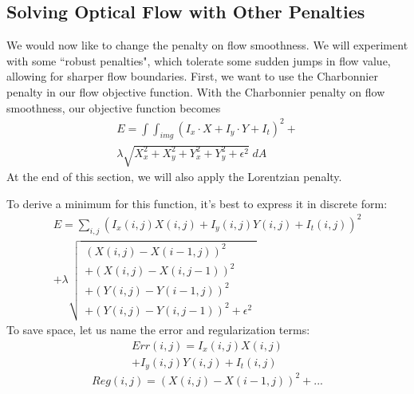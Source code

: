\documentclass[10pt,twocolumn,letterpaper]{article}
\begin{document}
\subsection{Solving Optical Flow with Other Penalties}
We would now like to change the penalty on flow smoothness.  We will experiment with some ``robust penalties", which tolerate some sudden jumps in flow value, allowing for sharper flow boundaries.  First, we want to use the Charbonnier penalty in our flow objective function.  With the Charbonnier penalty on flow smoothness, our objective function becomes
\begin{multline} \label{eq:objectivec}
E = \int \int_{img} (I_x \cdot X + I_y \cdot Y + I_t)^2 + \\
\lambda \sqrt{X_x^2 + X_y^2 + Y_x^2 + Y_y^2 + \epsilon^2} \; dA 
\end{multline}
At the end of this section, we will also apply the Lorentzian penalty.

To derive a minimum for this function, it's best to express it in discrete form:
\begin{multline} \label{eq:objectivecDiscrete}
E = \sum_{i,j} (I_x(i, j) X(i, j) + I_y(i, j) Y(i, j) + I_t(i, j))^2 \\
+ \lambda \sqrt{
\begin{array}{c}
(X(i, j) - X(i-1, j))^2 \\
+ (X(i,j) - X(i,j-1))^2 \\
+ (Y(i,j) - Y(i-1, j))^2 \\
+ (Y(i,j) - Y(i,j-1))^2 + \epsilon^2
\end{array}
}
\end{multline}
To save space, let us name the error and regularization terms:
\begin{multline} \label{eq:errorTerm}
Err(i, j) = I_x(i, j) X(i, j) \\
+ I_y(i, j) Y(i, j) + I_t(i, j)
\end{multline}
\begin{equation} \label{eq:regTerm}
Reg(i,j) = (X(i,j) - X(i-1,j))^2 + ...
\end{equation}
\end{document}
